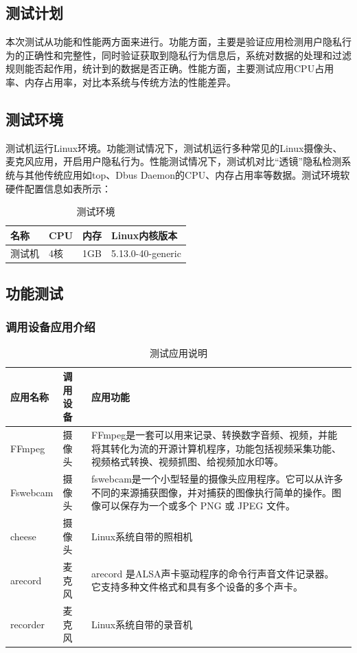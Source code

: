 \documentclass[12pt,a4paper]{ctexart}
\begin{document}
\subsection{测试计划}
本次测试从功能和性能两方面来进行。功能方面，主要是验证应用检测用户隐私行为的正确性和完整性，同时验证获取到隐私行为信息后，系统对数据的处理和过滤规则能否起作用，统计到的数据是否正确。性能方面，主要测试应用CPU占用率、内存占用率，对比本系统与传统方法的性能差异。
\subsection{测试环境}
测试机运行Linux环境。功能测试情况下，测试机运行多种常见的Linux摄像头、麦克风应用，开启用户隐私行为。性能测试情况下，测试机对比“透镜”隐私检测系统与其他传统应用如top、Dbus Daemon的CPU、内存占用率等数据。测试环境软硬件配置信息如表所示：

\begin{table}
  \centering
\begin{tabular}{|l|l|l|l|}
  \hline
  \rowcolor{blue!50} 名称&CPU&内存&Linux内核版本\\
  \hline
  测试机&4核&1GB&5.13.0-40-generic\\
  \hline
\end{tabular}
\caption{测试环境}
\end{table}

\subsection{功能测试}
\subsubsection{调用设备应用介绍}
\begin{table}
\begin{tabular}{|p{3cm}|p{3cm}|p{6cm}|}
  \hline
  \rowcolor{blue!50}应用名称&调用设备&应用功能\\
  \hline
FFmpeg&摄像头&FFmpeg是一套可以用来记录、转换数字音频、视频，并能将其转化为流的开源计算机程序，功能包括视频采集功能、视频格式转换、视频抓图、给视频加水印等。\\
\hline
Fswebcam&摄像头&fswebcam是一个小型轻量的摄像头应用程序。它可以从许多不同的来源捕获图像，并对捕获的图像执行简单的操作。图像可以保存为一个或多个 PNG 或 JPEG 文件。\\
\hline
cheese&摄像头&Linux系统自带的照相机\\
\hline
arecord&麦克风&arecord 是ALSA声卡驱动程序的命令行声音文件记录器。 它支持多种文件格式和具有多个设备的多个声卡。\\
\hline
recorder&麦克风&Linux系统自带的录音机\\
\hline
\end{tabular}
\caption{测试应用说明}
\end{table}
\end{document}
